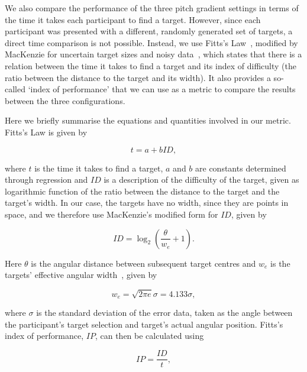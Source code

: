 \documentclass[]{interact}
\begin{document}
We also compare the performance of the three pitch gradient settings in terms of the time it takes each participant to find a target.
However, since each participant was presented with a different, randomly generated set of targets, a direct time comparison is not possible.
Instead, we use Fitts's Law~\citep{fitts1954information}, modified by MacKenzie for uncertain target sizes and noisy data~\citep{mackenzie1992fitts}, which states that there is a relation between the time it takes to find a target and its index of difficulty (the ratio between the distance to the target and its width).
It also provides a so-called `index of performance' that we can use as a metric to compare the results between the three configurations. 

Here we briefly summarise the equations and quantities involved in our metric.
Fitts's Law is given by  

\begin{equation}
  \label{eq:fitts-base}
  t = a + bID,
\end{equation}

\noindent
where $t$ is the time it takes to find a target, $a$ and $b$ are constants determined through regression and $ID$ is a description of the difficulty of the target, given as logarithmic function of the ratio between the distance to the target and the target's width.
In our case, the targets have no width, since they are points in space, and we therefore use MacKenzie's modified form for $ID$, given by

\begin{equation}
  \label{eq:fitts-id}
  ID = \log_2\left(\frac{\theta}{w_e} + 1\right).
\end{equation}

\noindent
Here $\theta$ is the angular distance between subsequent target centres and $w_e$ is the targets' effective angular width~\citep{welford1968fundamentals}, given by

\begin{equation}
  \label{eq:fitts-we}
  w_e = \sqrt{2\pi e}\sigma = 4.133\sigma,
\end{equation}

\noindent
where $\sigma$ is the standard deviation of the error data, taken as the angle between the participant's target selection and target's actual angular position.
Fitts's index of performance, $IP$, can then be calculated using 

\begin{equation}
  \label{eq:fitts-performance}
  IP = \frac{ID}{t},
\end{equation}
\end{document}
